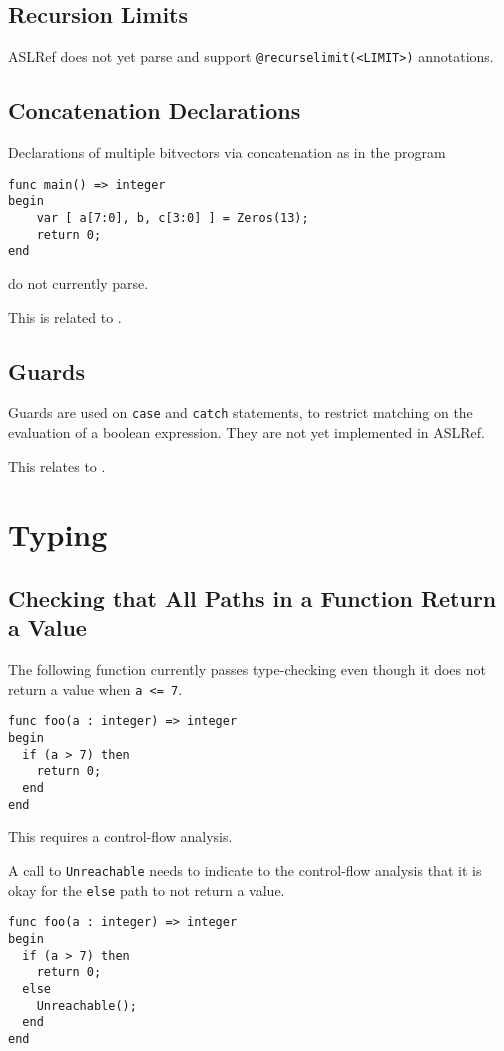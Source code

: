 \documentclass{book}
\begin{document}
\subsection{Recursion Limits}
ASLRef does not yet parse and support \texttt{@recurselimit(<LIMIT>)} annotations.

\subsection{Concatenation Declarations}
Declarations of multiple bitvectors via concatenation as in the program
\begin{Verbatim}
func main() => integer
begin
    var [ a[7:0], b, c[3:0] ] = Zeros(13);
    return 0;
end
\end{Verbatim}
do not currently parse.

This is related to .

\subsection{Guards}

Guards are used on \texttt{case} and \texttt{catch} statements, to restrict
matching on the evaluation of a boolean expression.
%
They are not yet implemented in ASLRef.

This relates to .

\section{Typing}

\subsection{Checking that All Paths in a Function Return a Value}
The following function currently passes type-checking even though
it does not return a value when \texttt{a <= 7}.
\begin{verbatim}
func foo(a : integer) => integer
begin
  if (a > 7) then
    return 0;
  end
end
\end{verbatim}
This requires a control-flow analysis.

A call to \texttt{Unreachable} needs to indicate to the control-flow
analysis that it is okay for the \texttt{else} path to not return a value.
\begin{verbatim}
func foo(a : integer) => integer
begin
  if (a > 7) then
    return 0;
  else
    Unreachable();
  end
end
\end{verbatim}
\end{document}
